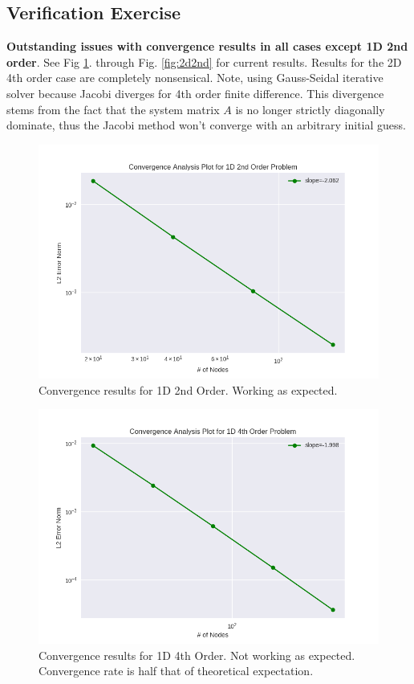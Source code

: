 \documentclass[letterpaper,12pt]{article}
\begin{document}
\subsection{Verification Exercise}
\textbf{Outstanding issues with convergence results in all cases except 1D 2nd order}. See Fig \ref{fig:1d2nd}. through Fig. \ref{fig:2d2nd} for current results. Results for the 2D 4th order case are completely nonsensical. Note, using Gauss-Seidal iterative solver because Jacobi diverges for 4th order finite difference. This divergence stems from the fact that the system matrix $A$ is no longer strictly diagonally dominate, thus the Jacobi method won't converge with an arbitrary initial guess.

\begin{figure}[h]
\centering
\label{fig:1d2nd}
\includegraphics[width=1 \textwidth]{1d2nd.PNG}
\caption{Convergence results for 1D 2nd Order. Working as expected.}
\end{figure}

\begin{figure}[h]
\centering
\label{fig:1d4th}
\includegraphics[width=1 \textwidth]{1d4th.PNG}
\caption{Convergence results for 1D 4th Order. Not working as expected. Convergence rate is half that of theoretical expectation.}
\end{figure}
\end{document}
